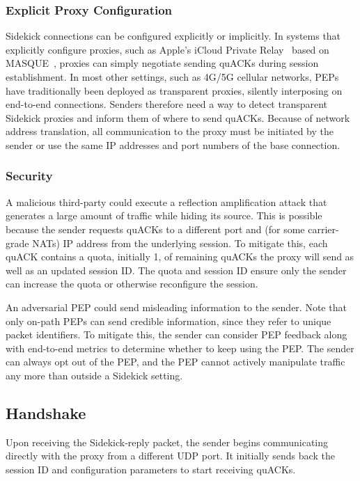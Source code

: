 \subsubsection{Explicit Proxy Configuration}

Sidekick connections can be configured explicitly or implicitly.  In systems that
explicitly configure proxies, such as Apple's iCloud Private Relay~\cite{icloud-private-relay}
based on MASQUE~\cite{kosek2021masque,kramer2021masquepep}, proxies can simply negotiate
sending quACKs during session establishment.  In most other settings,
such as 4G/5G cellular networks, PEPs have traditionally been deployed
as transparent proxies, silently interposing on end-to-end
connections.  Senders therefore need a way to detect transparent Sidekick
proxies and inform them of where to send quACKs.  Because of network
address translation, all communication to the proxy must be initiated
by the sender or use the same IP addresses and port numbers of the
base connection.

\subsubsection{Security}
A malicious third-party could execute a reflection amplification attack that
generates a large amount of traffic while hiding its source. This is
possible because the sender requests quACKs to a different port and (for some
carrier-grade NATs) IP address from the underlying session. To mitigate this,
each quACK contains a quota, initially 1, of remaining quACKs the proxy will
send as well as an updated session ID\@.
The quota and session ID ensure only the sender can increase the quota or
otherwise reconfigure the session.

An adversarial PEP could send misleading information to the sender. Note that
only on-path PEPs can send credible information, since they refer to unique
packet identifiers.
To mitigate this, the sender can consider PEP feedback along with
end-to-end metrics to determine whether to keep using the PEP. The sender can
always opt out of the PEP, and the PEP cannot actively manipulate traffic any
more than outside a Sidekick setting.

\subsection{Handshake}
\label{sec:sidekick:protocol:handshake}

Upon receiving the Sidekick-reply packet, the sender begins communicating
directly with the proxy from a different UDP port.  It initially sends
back the session ID and configuration parameters to start receiving
quACKs.

